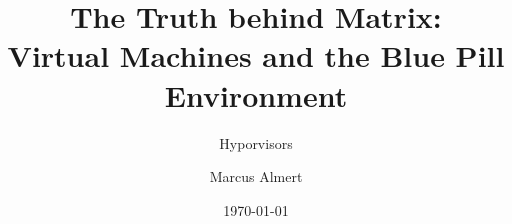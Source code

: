 \title[BluePill]{The Truth behind Matrix:\\ Virtual Machines and the Blue Pill Environment}
\subtitle{\Large{Hyporvisors}}
\author[M. Almert]{Marcus Almert}

\date{\today}
\raggedright
\AtBeginSection{\frame{\sectionpage}}

